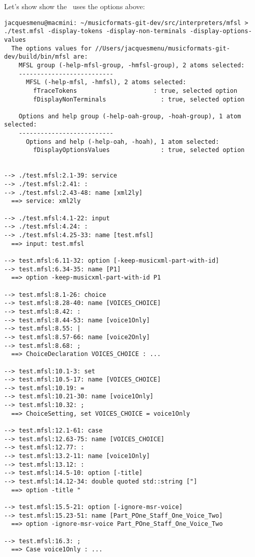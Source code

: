 Let's show show the \mfslInterp\ uses the options above:
\begin{lstlisting}[language=Terminal]
jacquesmenu@macmini: ~/musicformats-git-dev/src/interpreters/mfsl > ./test.mfsl -display-tokens -display-non-terminals -display-options-values
  The options values for //Users/jacquesmenu/musicformats-git-dev/build/bin/mfsl are:
    MFSL group (-help-mfsl-group, -hmfsl-group), 2 atoms selected:
    --------------------------
      MFSL (-help-mfsl, -hmfsl), 2 atoms selected:
        fTraceTokens                     : true, selected option
        fDisplayNonTerminals               : true, selected option

    Options and help group (-help-oah-group, -hoah-group), 1 atom selected:
    --------------------------
      Options and help (-help-oah, -hoah), 1 atom selected:
        fDisplayOptionsValues              : true, selected option


--> ./test.mfsl:2.1-39: service
--> ./test.mfsl:2.41: :
--> ./test.mfsl:2.43-48: name [xml2ly]
  ==> service: xml2ly

--> ./test.mfsl:4.1-22: input
--> ./test.mfsl:4.24: :
--> ./test.mfsl:4.25-33: name [test.mfsl]
  ==> input: test.mfsl

--> test.mfsl:6.11-32: option [-keep-musicxml-part-with-id]
--> test.mfsl:6.34-35: name [P1]
  ==> option -keep-musicxml-part-with-id P1

--> test.mfsl:8.1-26: choice
--> test.mfsl:8.28-40: name [VOICES_CHOICE]
--> test.mfsl:8.42: :
--> test.mfsl:8.44-53: name [voice1Only]
--> test.mfsl:8.55: |
--> test.mfsl:8.57-66: name [voice2Only]
--> test.mfsl:8.68: ;
  ==> ChoiceDeclaration VOICES_CHOICE : ...

--> test.mfsl:10.1-3: set
--> test.mfsl:10.5-17: name [VOICES_CHOICE]
--> test.mfsl:10.19: =
--> test.mfsl:10.21-30: name [voice1Only]
--> test.mfsl:10.32: ;
  ==> ChoiceSetting, set VOICES_CHOICE = voice1Only

--> test.mfsl:12.1-61: case
--> test.mfsl:12.63-75: name [VOICES_CHOICE]
--> test.mfsl:12.77: :
--> test.mfsl:13.2-11: name [voice1Only]
--> test.mfsl:13.12: :
--> test.mfsl:14.5-10: option [-title]
--> test.mfsl:14.12-34: double quoted std::string ["]
  ==> option -title "

--> test.mfsl:15.5-21: option [-ignore-msr-voice]
--> test.mfsl:15.23-51: name [Part_POne_Staff_One_Voice_Two]
  ==> option -ignore-msr-voice Part_POne_Staff_One_Voice_Two

--> test.mfsl:16.3: ;
  ==> Case voice1Only : ...


\end{lstlisting}
